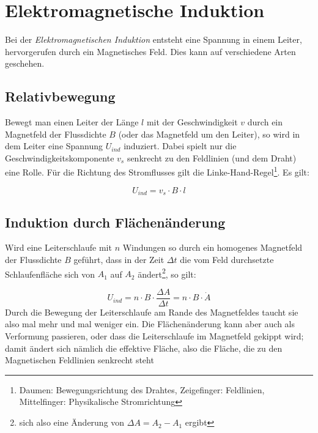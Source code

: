 		\chapter{Elektromagnetische Induktion}

Bei der \textit{Elektromagnetischen Induktion} entsteht eine Spannung in einem Leiter, hervorgerufen durch ein Magnetisches Feld. Dies kann auf verschiedene Arten geschehen.

		\section{Relativbewegung}

Bewegt man einen Leiter der Länge \(l\) mit der Geschwindigkeit \(v\) durch ein Magnetfeld der Flussdichte \(B\) (oder das Magnetfeld um den Leiter), so wird in dem Leiter eine Spannung \(U_{ind}\) induziert. Dabei spielt nur die Geschwindigkeitskomponente \(v_s\) senkrecht zu den Feldlinien (und dem Draht) eine Rolle. Für die Richtung des Stromflusses gilt die Linke-Hand-Regel\footnote{Daumen: Bewegungsrichtung des Drahtes, Zeigefinger: Feldlinien, Mittelfinger: Physikalische Stromrichtung}. Es gilt:

\begin{equation}
U_{ind} = v_s \cdot B \cdot l
\end{equation}

		\section{Induktion durch Flächenänderung}
		\label{fland}

Wird eine Leiterschlaufe mit \(n\) Windungen so durch ein homogenes Magnetfeld der Flussdichte \(B\) geführt, dass in der Zeit \(\Delta t\) die vom Feld durchsetzte Schlaufenfläche sich von \(A_1\) auf \(A_2\) ändert\footnote{sich also eine Änderung von \(\Delta A = A_2 - A_1\) ergibt}, so gilt:

\begin{equation}
U_{ind} = n \cdot B \cdot \frac{\Delta A}{\Delta t} = n \cdot B \cdot \dot{A}
\label{eq_fland}
\end{equation}
Durch die Bewegung der Leiterschlaufe am Rande des Magnetfeldes taucht sie also mal mehr und mal weniger ein. Die Flächenänderung kann aber auch als Verformung passieren, oder dass die Leiterschlaufe im Magnetfeld gekippt wird; damit ändert sich nämlich die effektive Fläche, also die Fläche, die zu den Magnetischen Feldlinien senkrecht steht



